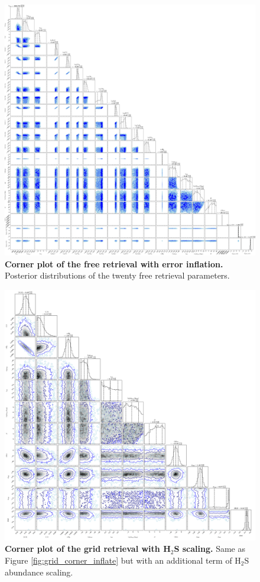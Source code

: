 \documentclass[sn-standardnature]{sn-jnl}%
\begin{document}
\begin{figure}
\centering
\includegraphics[width=\textwidth,keepaspectratio]{figs/ED_Fig9.pdf}
  \caption{\textbf{Corner plot of the free retrieval with error inflation.} Posterior distributions of the twenty free retrieval parameters.}
  \label{fig:free_corner_inflate}
\end{figure}

\begin{figure}
\centering
\includegraphics[width=\textwidth,keepaspectratio]{figs/ED_Fig10.pdf}
  \caption{\textbf{Corner plot of the grid retrieval with H$_2$S scaling.} Same as Figure \ref{fig:grid_corner_inflate} but with an additional term of H$_2$S abundance scaling.}
  \label{fig:grid_corner_inflate_scale}
\end{figure}
\end{document}
